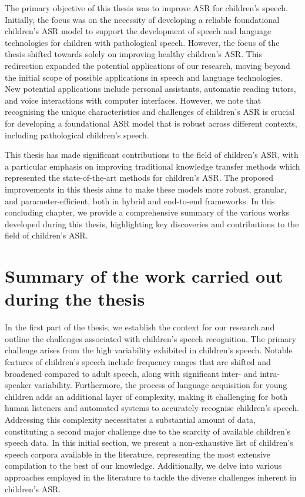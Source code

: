 \label{chap:8}
\cleardoublepage

The primary objective of this thesis was to improve \ac{ASR} for children's speech. Initially, the focus was on the necessity of developing a reliable foundational children's \ac{ASR} model to support the development of speech and language technologies for children with pathological speech. However, the focus of the thesis shifted towards solely on improving healthy children's \ac{ASR}. This redirection expanded the potential applications of our research, moving beyond the initial scope of possible applications in speech and language technologies. New potential applications include personal assistants, automatic reading tutors, and voice interactions with computer interfaces. However, we note that recognising the unique characteristics and challenges of children's \ac{ASR} is crucial for developing a foundational \ac{ASR} model that is robust across different contexts, including pathological children's speech.

This thesis has made significant contributions to the field of children's \ac{ASR}, with a particular emphasis on improving traditional knowledge transfer methods which represented the state-of-the-art methods for children's \ac{ASR}. The proposed improvements in this thesis aims to make these models more robust, granular, and parameter-efficient, both in hybrid and end-to-end frameworks. In this concluding chapter, we provide a comprehensive summary of the various works developed during this thesis, highlighting key discoveries and contributions to the field of children's \ac{ASR}.

\section{Summary of the work carried out during the thesis}
In the first part of the thesis, we establish the context for our research and outline the challenges associated with children's speech recognition. The primary challenge arises from the high variability exhibited in children's speech. Notable features of children's speech include frequency ranges that are shifted and broadened compared to adult speech, along with significant inter- and intra-speaker variability. Furthermore, the process of language acquisition for young children adds an additional layer of complexity, making it challenging for both human listeners and automated systems to accurately recognise children's speech. Addressing this complexity necessitates a substantial amount of data, constituting a second major challenge due to the scarcity of available children's speech data. In this initial section, we present a non-exhaustive list of children's speech corpora available in the literature, representing the most extensive compilation to the best of our knowledge. Additionally, we delve into various approaches employed in the literature to tackle the diverse challenges inherent in children's \ac{ASR}.

